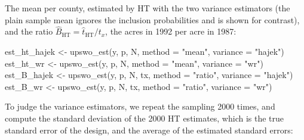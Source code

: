 \documentclass[
  letterpaper,
  DIV=11,
  numbers=noendperiod]{scrreprt}
\newenvironment{Shaded}{\begin{snugshade}}{\end{snugshade}}
\newcommand{\AttributeTok}[1]{\textcolor[rgb]{0.40,0.45,0.13}{#1}}
\newcommand{\FunctionTok}[1]{\textcolor[rgb]{0.28,0.35,0.67}{#1}}
\newcommand{\NormalTok}[1]{\textcolor[rgb]{0.00,0.23,0.31}{#1}}
\newcommand{\OtherTok}[1]{\textcolor[rgb]{0.00,0.23,0.31}{#1}}
\newcommand{\StringTok}[1]{\textcolor[rgb]{0.13,0.47,0.30}{#1}}
\renewcommand{\[}{\begin{equation}}
\renewcommand{\]}{\end{equation}}
\begin{document}
The mean per county, estimated by HT with the two variance estimators
(the plain sample mean ignores the inclusion probabilities and is shown
for contrast), and the ratio
\(\hat{B}_{\mathrm{HT}}=\hat{t}_{\mathrm{HT}}/t_x\), the acres in 1992
per acre in 1987:

\begin{Shaded}
\begin{Highlighting}[]
\NormalTok{est\_ht\_hajek }\OtherTok{\textless{}{-}} \FunctionTok{upswo\_est}\NormalTok{(y, p, N, }\AttributeTok{method =} \StringTok{"mean"}\NormalTok{, }\AttributeTok{variance =} \StringTok{"hajek"}\NormalTok{)}
\NormalTok{est\_ht\_wr    }\OtherTok{\textless{}{-}} \FunctionTok{upswo\_est}\NormalTok{(y, p, N, }\AttributeTok{method =} \StringTok{"mean"}\NormalTok{, }\AttributeTok{variance =} \StringTok{"wr"}\NormalTok{)}
\NormalTok{est\_B\_hajek }\OtherTok{\textless{}{-}} \FunctionTok{upswo\_est}\NormalTok{(y, p, N, tx, }\AttributeTok{method =} \StringTok{"ratio"}\NormalTok{, }\AttributeTok{variance =} \StringTok{"hajek"}\NormalTok{)}
\NormalTok{est\_B\_wr    }\OtherTok{\textless{}{-}} \FunctionTok{upswo\_est}\NormalTok{(y, p, N, tx, }\AttributeTok{method =} \StringTok{"ratio"}\NormalTok{, }\AttributeTok{variance =} \StringTok{"wr"}\NormalTok{)}
\end{Highlighting}
\end{Shaded}

To judge the variance estimators, we repeat the sampling 2000 times, and
compute the standard deviation of the 2000 HT estimates, which is the
true standard error of the design, and the average of the estimated
standard errors:
\end{document}
